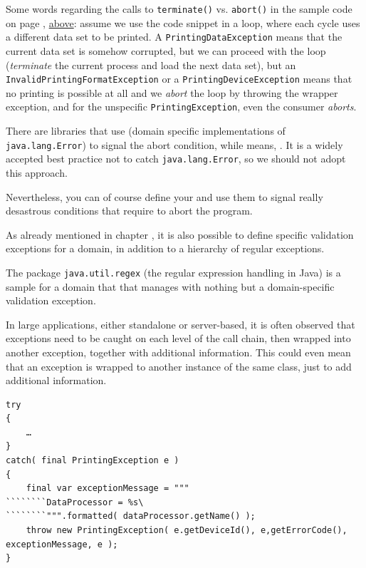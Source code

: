 \bigskip

Some words regarding the calls to \lstinline|terminate()| vs. \lstinline|abort()| in the sample code on page \pageref{listing:printingexceptions}, \hyperref[listing:printingexceptions]{above}: assume we use the code snippet in a loop, where each cycle uses a different data set to be printed. A \lstinline|PrintingDataException| means that the current data set is somehow corrupted, but we can proceed with the loop (\textit{terminate} the current process and load the next data set), but an \lstinline|InvalidPrintingFormatException| or a \lstinline|PrintingDeviceException| means that no printing is possible at all and we \textit{abort} the loop by throwing the wrapper exception, and for the unspecific \lstinline|PrintingException|, even the consumer \textit{aborts}.

There are libraries that use  (domain specific implementations of \lstinline|java.lang.Error|) to signal the abort condition, while  means, . It is a widely accepted best practice not to catch \lstinline|java.lang.Error|, so we should not adopt this approach.

Nevertheless, you can of course define your  and use them to signal really desastrous conditions that require to abort the program.

\bigskip

As already mentioned in chapter , it is also possible to define specific validation exceptions for a domain, in addition to a hierarchy of regular exceptions.

The package \lstinline|java.util.regex| \autocite{ORACLE_DOC_REGEX_PACKAGE} (the regular expression handling in Java) is a sample for a domain that that manages with nothing but a domain-specific validation exception.

\bigskip

In large applications, either standalone or server-based, it is often observed that exceptions need to be caught on each level of the call chain, then wrapped into another exception, together with additional information. This could even mean that an exception is wrapped to another instance of the same class, just to add additional information.
\begin{lstlisting}
try
{
    …
}
catch( final PrintingException e )
{
    final var exceptionMessage = """
````````DataProcessor = %s\
````````""".formatted( dataProcessor.getName() );
    throw new PrintingException( e.getDeviceId(), e,getErrorCode(), exceptionMessage, e );
}
\end{lstlisting}

